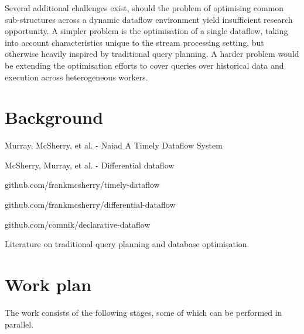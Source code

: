\documentclass[a4paper,10pt]{article}
\begin{document}
Several additional challenges exist, should the problem of optimising
common sub-structures across a dynamic dataflow environment yield
insufficient research opportunity. A simpler problem is the
optimisation of a single dataflow, taking into account characteristics
unique to the stream processing setting, but otherwise heavily
inspired by traditional query planning. A harder problem would be
extending the optimisation efforts to cover queries over historical
data and execution across heterogeneous workers.

\section{Background}

Murray, McSherry, et al. - Naiad A Timely Dataflow System

McSherry, Murray, et al. - Differential dataflow

github.com/frankmcsherry/timely-dataflow

github.com/frankmcsherry/differential-dataflow

github.com/comnik/declarative-dataflow

Literature on traditional query planning and database optimisation.

\section{Work plan}

The work consists of the following stages, some of which can be performed in parallel. 
\end{document}
